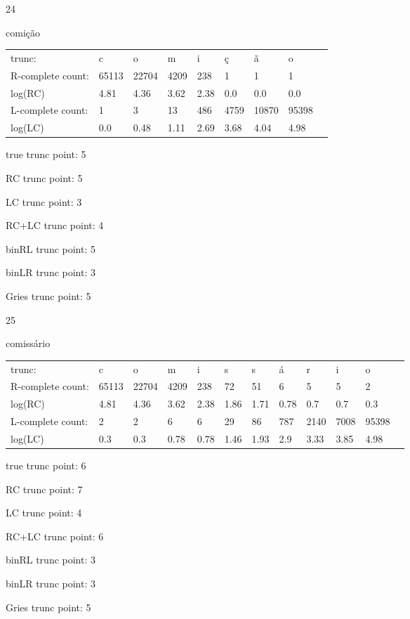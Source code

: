 \documentclass[10pt]{article}
\begin{document}
\vspace{1em}

24

comição

\begin{tabular}{l|llllllll}
trunc: & c & o & m & i & ç & ã & o & \\ 
R-complete count: & 65113 & 22704 & 4209 & 238 & 1 & 1 & 1 & \\ 
log(RC) & 4.81 & 4.36 & 3.62 & 2.38 & 0.0 & 0.0 & 0.0 & \\ 
L-complete count: & 1 & 3 & 13 & 486 & 4759 & 10870 & 95398 & \\ 
log(LC) & 0.0 & 0.48 & 1.11 & 2.69 & 3.68 & 4.04 & 4.98 & \\ 
\end{tabular}

true trunc point: 5

RC trunc point: 5

LC trunc point: 3

RC+LC trunc point: 4

binRL trunc point: 5

binLR trunc point: 3

Gries trunc point: 5

\newpage

25

comissário

\begin{tabular}{l|lllllllllll}
trunc: & c & o & m & i & s & s & á & r & i & o & \\ 
R-complete count: & 65113 & 22704 & 4209 & 238 & 72 & 51 & 6 & 5 & 5 & 2 & \\ 
log(RC) & 4.81 & 4.36 & 3.62 & 2.38 & 1.86 & 1.71 & 0.78 & 0.7 & 0.7 & 0.3 & \\ 
L-complete count: & 2 & 2 & 6 & 6 & 29 & 86 & 787 & 2140 & 7008 & 95398 & \\ 
log(LC) & 0.3 & 0.3 & 0.78 & 0.78 & 1.46 & 1.93 & 2.9 & 3.33 & 3.85 & 4.98 & \\ 
\end{tabular}

true trunc point: 6

RC trunc point: 7

LC trunc point: 4

RC+LC trunc point: 6

binRL trunc point: 3

binLR trunc point: 3

Gries trunc point: 5

\vspace{1em}
\end{document}
